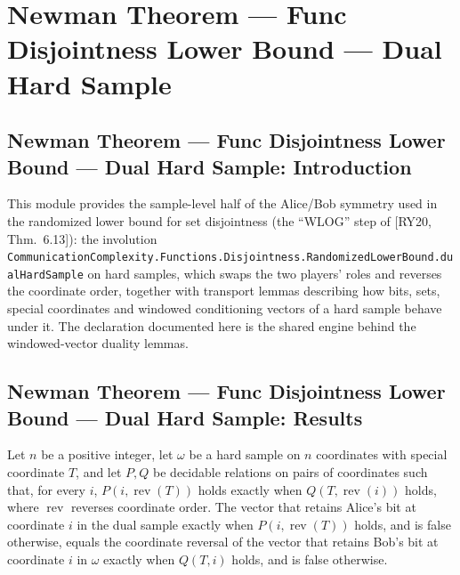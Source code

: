 \section{Newman Theorem --- Func Disjointness Lower Bound --- Dual Hard Sample}
\subsection*{Newman Theorem --- Func Disjointness Lower Bound --- Dual Hard Sample: Introduction}

This module provides the sample-level half of the Alice/Bob symmetry used in the randomized
lower bound for set disjointness (the ``WLOG'' step of [RY20, Thm.\ 6.13]): the involution
\texttt{CommunicationComplexity.Functions.Disjointness.RandomizedLowerBound.dualHardSample}
on hard samples, which swaps the two players' roles and reverses the coordinate order,
together with transport lemmas describing how bits, sets, special coordinates and windowed
conditioning vectors of a hard sample behave under it.  The declaration documented here is
the shared engine behind the windowed-vector duality lemmas.

\subsection*{Newman Theorem --- Func Disjointness Lower Bound --- Dual Hard Sample: Results}

\begin{theorem}
\label{CommunicationComplexity.Functions.Disjointness.RandomizedLowerBound.xWindow_dualHardSample_eq_reverse}
\leanok
{}
Let $n$ be a positive integer, let $\omega$ be a hard sample on $n$ coordinates with
special coordinate $T$, and let $P,Q$ be decidable relations on pairs of coordinates
such that, for every $i$, $P(i,\operatorname{rev}(T))$ holds exactly when
$Q(T,\operatorname{rev}(i))$ holds, where $\operatorname{rev}$ reverses coordinate
order. The vector that retains Alice’s bit at coordinate $i$ in the dual sample exactly
when $P(i,\operatorname{rev}(T))$ holds, and is false otherwise, equals the coordinate
reversal of the vector that retains Bob’s bit at coordinate $i$ in $\omega$ exactly
when $Q(T,i)$ holds, and is false otherwise.
\end{theorem}
